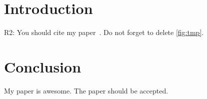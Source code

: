 \section{Introduction}

R2: You should cite my paper~\cite{okumura2022offline}.
Do not forget to delete \cref{fig:tmp}.



\section{Conclusion}

My paper is awesome.
The paper should be accepted.
